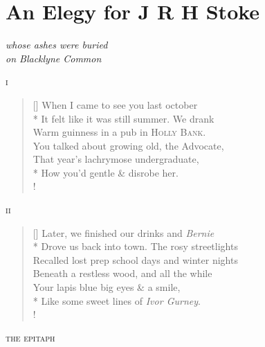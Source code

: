 \documentclass[openany]{amsbook}
\begin{document}
\chapter*{An Elegy for J R H Stoke}

\begin{center}
\textit{whose ashes were buried}\\
\textit{on Blacklyne Common}
\end{center}

\bigskip

\begin{center}
\textsc{i}
\end{center}

\settowidth{\versewidth}{It felt like it was still summer. We drank}
\begin{verse}[\versewidth]
When I came to see you last october\\*
It felt like it was still summer. We drank\\
Warm guinness in a pub in \textsc{Holly Bank}.\\
You talked about growing old, the {\hoskeroe Advocate},\\
That year's lachrymose undergraduate,\\*
How you'd gentle \& disrobe her.\\!
\end{verse}

\bigskip

\begin{center}
\textsc{ii}
\end{center}

\settowidth{\versewidth}{It felt like it was still summer. We drank}
\begin{verse}[\versewidth]
Later, we finished our drinks and \textit{Bernie}\\*
Drove us back into town. The rosy streetlights\\
Recalled lost prep school days and winter nights\\
Beneath a restless wood, and all the while\\
Your lapis blue big eyes \&  a smile,\\*
Like some  sweet lines of \textit{Ivor Gurney}.\\!
\end{verse}

\bigskip

\begin{center}
\textsc{the epitaph}
\end{center}
\end{document}
